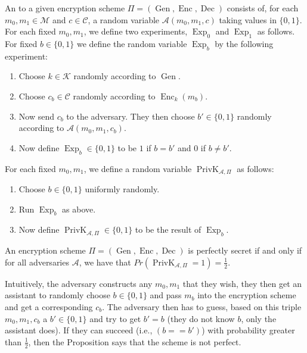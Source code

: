 \documentclass[twoside, a4paper, 10pt]{amsart}
\begin{document}
\begin{mydef}[Adversary] \label{def: adversary} An  to a given encryption scheme $\Pi = (\operatorname{Gen}, \operatorname{Enc}, \operatorname{Dec})$ consists of, for each $m_0,m_1 \in \mathcal{M}$ and $c \in \mathcal{C}$, a random variable $\mathcal{A}(m_0, m_1, c)$ taking values in $\{0,1\}$. For each fixed $m_0,m_1$, we define two experiments, $\operatorname{Exp}_0$ and $\operatorname{Exp}_1$ as follows. For fixed $b \in \{0,1\}$ we define the random variable $\operatorname{Exp}_b$ by the following experiment:

\begin{enumerate}
	\item Choose $k \in \mathcal{K}$ randomly according to $\operatorname{Gen}$.
	\item Choose $c_b \in \mathcal{C}$ randomly according to $\operatorname{Enc}_k(m_b)$.
	\item Now send $c_b$ to the adversary. They then choose $b' \in \{0,1\}$ randomly according to $\mathcal{A}(m_0, m_1, c_b)$.
	\item Now define $\operatorname{Exp}_b \in \{0,1\}$ to be $1$ if $b = b'$ and $0$ if $b \neq b'$.
\end{enumerate}

 For each fixed $m_0,m_1$, we define a random variable $\operatorname{PrivK}_{\mathcal{A}, \Pi}$ as follows:

\begin{enumerate}
	\item Choose $b \in \{0,1\}$ uniformly randomly.
	\item Run $\operatorname{Exp}_b$ as above.
	\item Now define $\operatorname{PrivK}_{\mathcal{A}, \Pi} \in \{0,1\}$ to be the result of $\operatorname{Exp}_b$.

\end{enumerate}

\end{mydef}

\begin{prop} An encryption scheme $\Pi = (\operatorname{Gen}, \operatorname{Enc}, \operatorname{Dec})$ is perfectly secret if and only if for all adversaries $\mathcal{A}$, we have that $Pr(\operatorname{PrivK}_{\mathcal{A}, \Pi} = 1) = \frac{1}{2}. $

\end{prop}

Intuitively, the adversary constructs any $m_0,m_1$ that they wish, they then get an assistant to randomly choose $b \in \{0,1\}$ and pass $m_b$ into the encryption scheme and get a corresponding $c_b$. The adversary then has to guess, based on this triple $m_0, m_1, c_b$ a $b' \in \{0,1\}$ and try to get $b' = b$ (they do not know $b$, only the assistant does). If they can succeed (i.e., $(b == b')$) with probability greater than $\frac{1}{2}$, then the Proposition says that the scheme is not perfect.
\end{document}
